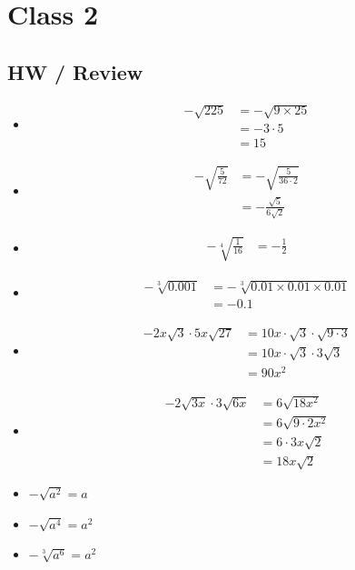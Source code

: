 \documentclass{hw}
\begin{document}
\section*{Class 2}

\subsection*{\normalsize HW / Review}
\begin{itemize}
    \item 
    \begin{align*}
        -\sqrt{225} &= -\sqrt{9 \times 25} \\
                    &= -3 \cdot 5 \\
                    &= 15
    \end{align*}
    \item 
    \begin{align*}
        -\sqrt{\frac{5}{72}} &= -\sqrt{\frac{5}{36 \cdot 2}} \\
                             &= -\frac{\sqrt{5}}{6 \sqrt{2}}
    \end{align*}
    \item 
    \begin{align*}
        -\sqrt[4]{\frac{1}{16}} &= -\frac{1}{2}
    \end{align*}
    \item 
    \begin{align*}
        -\sqrt[3]{0.001} &= -\sqrt[3]{0.01 \times 0.01 \times 0.01} \\
                         &= -0.1
    \end{align*}
    \item 
    \begin{align*}
        -2x\sqrt{3} \cdot 5x\sqrt{27} &= 10x \cdot \sqrt{3} \cdot \sqrt{9 \cdot 3} \\
                                      &= 10x \cdot \sqrt{3} \cdot 3 \sqrt{3} \\
                                      &= 90x^2
    \end{align*}
    \item 
    \begin{align*}
        -2\sqrt{3x} \cdot 3\sqrt{6x} &= 6\sqrt{18x^2} \\
                                     &= 6\sqrt{9 \cdot 2x^2} \\
                                     &= 6 \cdot 3x \sqrt{2} \\
                                     &= 18x \sqrt{2}
    \end{align*}
    \item \( -\sqrt{a^2} = a \)
    \item \( -\sqrt{a^4} = a^2 \)
    \item \( -\sqrt[3]{a^6} = a^2 \)
\end{itemize}
\end{document}
